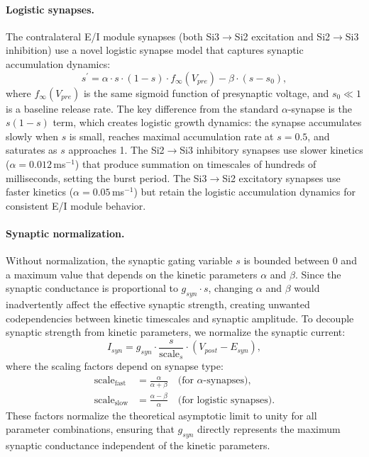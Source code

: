 \paragraph{Logistic synapses.}
The contralateral E/I module synapses (both Si3$\to$Si2 excitation and Si2$\to$Si3 inhibition) use a novel logistic synapse model that captures synaptic accumulation dynamics:
\begin{equation}
{s}^\prime = \alpha \cdot s \cdot (1-s) \cdot f_{\infty}(V_{pre}) - \beta \cdot (s - s_0),
\end{equation}
where $f_{\infty}(V_{pre})$ is the same sigmoid function of presynaptic voltage, and $s_0 \ll 1$ is a baseline release rate.
The key difference from the standard $\alpha$-synapse is the $s(1-s)$ term, which creates logistic growth dynamics: the synapse accumulates slowly when $s$ is small, reaches maximal accumulation rate at $s = 0.5$, and saturates as $s$ approaches 1.
The Si2$\to$Si3 inhibitory synapses use slower kinetics ($\alpha = 0.012$\,ms$^{-1}$) that produce summation on timescales of hundreds of milliseconds, setting the burst period.
The Si3$\to$Si2 excitatory synapses use faster kinetics ($\alpha = 0.05$\,ms$^{-1}$) but retain the logistic accumulation dynamics for consistent E/I module behavior.

\paragraph{Synaptic normalization.}
Without normalization, the synaptic gating variable $s$ is bounded between 0 and a maximum value that depends on the kinetic parameters $\alpha$ and $\beta$.
Since the synaptic conductance is proportional to $g_{syn} \cdot s$, changing $\alpha$ and $\beta$ would inadvertently affect the effective synaptic strength, creating unwanted codependencies between kinetic timescales and synaptic amplitude.
To decouple synaptic strength from kinetic parameters, we normalize the synaptic current:
\begin{equation}
I_{syn} = g_{syn} \cdot \frac{s}{\text{scale}_s} \cdot (V_{post} - E_{syn}),
\end{equation}
where the scaling factors depend on synapse type:
\begin{align}
\text{scale}_{\text{fast}} &= \frac{\alpha}{\alpha + \beta} \quad \text{(for $\alpha$-synapses)}, \\
\text{scale}_{\text{slow}} &= \frac{\alpha - \beta}{\alpha} \quad \text{(for logistic synapses)}.
\end{align}
These factors normalize the theoretical asymptotic limit to unity for all parameter combinations, ensuring that $g_{syn}$ directly represents the maximum synaptic conductance independent of the kinetic parameters.



